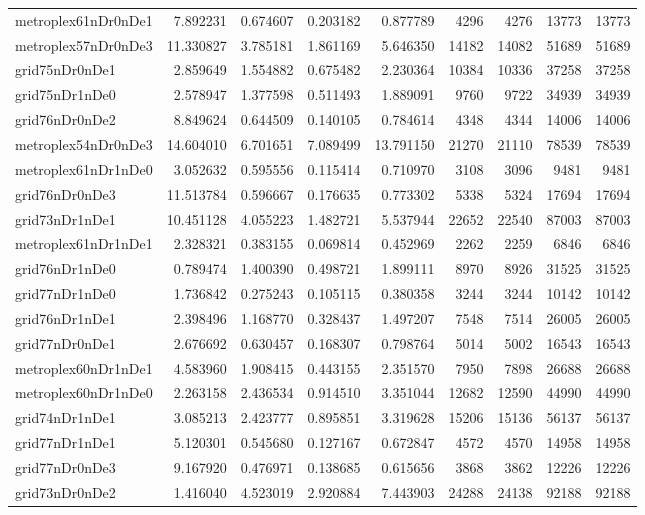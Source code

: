 \begin{longtable}{|l|r|r|r|r|r|r|r|r|}
metroplex61nDr0nDe1 & 7.892231 & 0.674607 & 0.203182 & 0.877789 & 4296 & 4276 & 13773 & 13773 \\
metroplex57nDr0nDe3 & 11.330827 & 3.785181 & 1.861169 & 5.646350 & 14182 & 14082 & 51689 & 51689 \\
grid75nDr0nDe1 & 2.859649 & 1.554882 & 0.675482 & 2.230364 & 10384 & 10336 & 37258 & 37258 \\
grid75nDr1nDe0 & 2.578947 & 1.377598 & 0.511493 & 1.889091 & 9760 & 9722 & 34939 & 34939 \\
grid76nDr0nDe2 & 8.849624 & 0.644509 & 0.140105 & 0.784614 & 4348 & 4344 & 14006 & 14006 \\
metroplex54nDr0nDe3 & 14.604010 & 6.701651 & 7.089499 & 13.791150 & 21270 & 21110 & 78539 & 78539 \\
metroplex61nDr1nDe0 & 3.052632 & 0.595556 & 0.115414 & 0.710970 & 3108 & 3096 & 9481 & 9481 \\
grid76nDr0nDe3 & 11.513784 & 0.596667 & 0.176635 & 0.773302 & 5338 & 5324 & 17694 & 17694 \\
grid73nDr1nDe1 & 10.451128 & 4.055223 & 1.482721 & 5.537944 & 22652 & 22540 & 87003 & 87003 \\
metroplex61nDr1nDe1 & 2.328321 & 0.383155 & 0.069814 & 0.452969 & 2262 & 2259 & 6846 & 6846 \\
grid76nDr1nDe0 & 0.789474 & 1.400390 & 0.498721 & 1.899111 & 8970 & 8926 & 31525 & 31525 \\
grid77nDr1nDe0 & 1.736842 & 0.275243 & 0.105115 & 0.380358 & 3244 & 3244 & 10142 & 10142 \\
grid76nDr1nDe1 & 2.398496 & 1.168770 & 0.328437 & 1.497207 & 7548 & 7514 & 26005 & 26005 \\
grid77nDr0nDe1 & 2.676692 & 0.630457 & 0.168307 & 0.798764 & 5014 & 5002 & 16543 & 16543 \\
metroplex60nDr1nDe1 & 4.583960 & 1.908415 & 0.443155 & 2.351570 & 7950 & 7898 & 26688 & 26688 \\
metroplex60nDr1nDe0 & 2.263158 & 2.436534 & 0.914510 & 3.351044 & 12682 & 12590 & 44990 & 44990 \\
grid74nDr1nDe1 & 3.085213 & 2.423777 & 0.895851 & 3.319628 & 15206 & 15136 & 56137 & 56137 \\
grid77nDr1nDe1 & 5.120301 & 0.545680 & 0.127167 & 0.672847 & 4572 & 4570 & 14958 & 14958 \\
grid77nDr0nDe3 & 9.167920 & 0.476971 & 0.138685 & 0.615656 & 3868 & 3862 & 12226 & 12226 \\
grid73nDr0nDe2 & 1.416040 & 4.523019 & 2.920884 & 7.443903 & 24288 & 24138 & 92188 & 92188 \\

\end{longtable}

